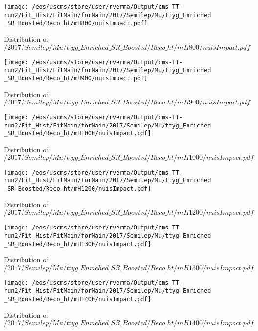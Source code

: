 \begin{figure}
\centering
\texttt{[image: /eos/uscms/store/user/rverma/Output/cms-TT-run2/Fit\_Hist/FitMain/forMain/2017/Semilep/Mu/ttyg\_Enriched\_SR\_Boosted/Reco\_ht/mH800/nuisImpact.pdf]}
\caption{Distribution of $/2017/Semilep/Mu/ttyg\_Enriched\_SR\_Boosted/Reco\_ht/mH800/nuisImpact.pdf$}
\end{figure}

\begin{figure}
\centering
\texttt{[image: /eos/uscms/store/user/rverma/Output/cms-TT-run2/Fit\_Hist/FitMain/forMain/2017/Semilep/Mu/ttyg\_Enriched\_SR\_Boosted/Reco\_ht/mH900/nuisImpact.pdf]}
\caption{Distribution of $/2017/Semilep/Mu/ttyg\_Enriched\_SR\_Boosted/Reco\_ht/mH900/nuisImpact.pdf$}
\end{figure}

\begin{figure}
\centering
\texttt{[image: /eos/uscms/store/user/rverma/Output/cms-TT-run2/Fit\_Hist/FitMain/forMain/2017/Semilep/Mu/ttyg\_Enriched\_SR\_Boosted/Reco\_ht/mH1000/nuisImpact.pdf]}
\caption{Distribution of $/2017/Semilep/Mu/ttyg\_Enriched\_SR\_Boosted/Reco\_ht/mH1000/nuisImpact.pdf$}
\end{figure}

\begin{figure}
\centering
\texttt{[image: /eos/uscms/store/user/rverma/Output/cms-TT-run2/Fit\_Hist/FitMain/forMain/2017/Semilep/Mu/ttyg\_Enriched\_SR\_Boosted/Reco\_ht/mH1200/nuisImpact.pdf]}
\caption{Distribution of $/2017/Semilep/Mu/ttyg\_Enriched\_SR\_Boosted/Reco\_ht/mH1200/nuisImpact.pdf$}
\end{figure}

\begin{figure}
\centering
\texttt{[image: /eos/uscms/store/user/rverma/Output/cms-TT-run2/Fit\_Hist/FitMain/forMain/2017/Semilep/Mu/ttyg\_Enriched\_SR\_Boosted/Reco\_ht/mH1300/nuisImpact.pdf]}
\caption{Distribution of $/2017/Semilep/Mu/ttyg\_Enriched\_SR\_Boosted/Reco\_ht/mH1300/nuisImpact.pdf$}
\end{figure}

\begin{figure}
\centering
\texttt{[image: /eos/uscms/store/user/rverma/Output/cms-TT-run2/Fit\_Hist/FitMain/forMain/2017/Semilep/Mu/ttyg\_Enriched\_SR\_Boosted/Reco\_ht/mH1400/nuisImpact.pdf]}
\caption{Distribution of $/2017/Semilep/Mu/ttyg\_Enriched\_SR\_Boosted/Reco\_ht/mH1400/nuisImpact.pdf$}
\end{figure}

